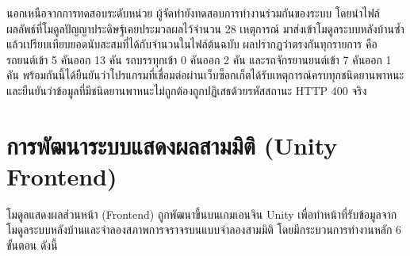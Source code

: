 นอกเหนือจากการทดสอบระดับหน่วย ผู้จัดทำยังทดสอบการทำงานร่วมกันของระบบ โดยนำไฟล์ผลลัพธ์ที่โมดูลปัญญาประดิษฐ์เคยประมวลผลไว้จำนวน 28 เหตุการณ์ มาส่งเข้าโมดูลระบบหลังบ้านซ้ำ แล้วเปรียบเทียบยอดนับสะสมที่ได้กับจำนวนในไฟล์ต้นฉบับ ผลปรากฏว่าตรงกันทุกรายการ คือรถยนต์เข้า 5 คันออก 13 คัน รถบรรทุกเข้า 0 คันออก 2 คัน และรถจักรยานยนต์เข้า 7 คันออก 1 คัน  พร้อมกันนี้ได้ยืนยันว่าโปรแกรมที่เชื่อมต่อผ่านเว็บซ็อกเก็ตได้รับเหตุการณ์ครบทุกชนิดยานพาหนะ และยืนยันว่าข้อมูลที่มีชนิดยานพาหนะไม่ถูกต้องถูกปฏิเสธด้วยรหัสสถานะ HTTP 400 จริง


\section{การพัฒนาระบบแสดงผลสามมิติ (Unity Frontend)}
\label{sec:visualization}

โมดูลแสดงผลส่วนหน้า (Frontend) ถูกพัฒนาขึ้นบนเกมเอนจิน Unity เพื่อทำหน้าที่รับข้อมูลจากโมดูลระบบหลังบ้านและจำลองสภาพการจราจรบนแบบจำลองสามมิติ โดยมีกระบวนการทำงานหลัก 6 ขั้นตอน ดังนี้

